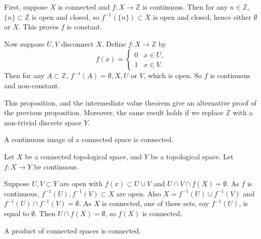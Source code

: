 \documentclass[12pt]{article}
\begin{document}
\begin{proofbox}
	First, suppose $X$ is connected and $f : X \to \mathbb{Z}$ is continuous. Then for any $n \in \mathbb{Z}$, $\{n\} \subset \mathbb{Z}$ is open and closed, so $f^{-1}(\{n\}) \subset X$ is open and closed, hence either $\emptyset$ or $X$. This proves $f$ is constant.

	Now suppose $U, V$ disconnect $X$. Define $f : X \to \mathbb{Z}$ by
	\[
		f(x) =
		\begin{cases}
			0 & x \in U, \\
			1 & x \in V.
		\end{cases}
	\]
	Then for any $A \subset \mathbb{Z}$, $f^{-1}(A) = \emptyset, X, U$ or $V$, which is open. So $f$ is continuous and non-constant.
\end{proofbox}

\begin{remark}
	This proposition, and the intermediate value theorem give an alternative proof of the previous proposition. Moreover, the same result holds if we replace $\mathbb{Z}$ with a non-trivial discrete space $Y$.
\end{remark}

\begin{proposition}
	A continuous image of a connected space is connected.
\end{proposition}

\begin{proofbox}
	Let $X$ be a connected topological space, and $Y$ be a topological space. Let $f : X \to Y$ be continuous.

	Suppose $U, V \subset Y$ are open with $f(x) \subset U \cup V$ and $U \cap V \cap f(X) = \emptyset$. As $f$ is continuous, $f^{-1}(U), f^{-1}(V) \subset X$ are open. Also $X = f^{-1}(U) \cup f^{-1}(V)$ and $f^{-1}(U) \cap f^{-1}(V) = \emptyset$. As $X$ is connected, one of these sets, say $f^{-1}(U)$, is equal to $\emptyset$. Then $U \cap f(X) = \emptyset$, so $f(X)$ is connected.
\end{proofbox}

\begin{proposition}
	A product of connected spaces is connected.
\end{proposition}
\end{document}
